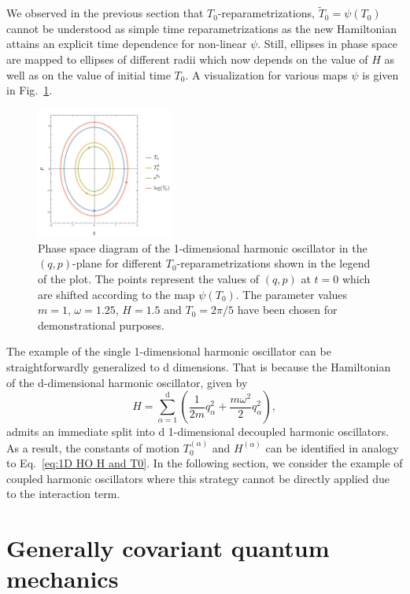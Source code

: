 \documentclass[onecolumn,notitlepage,superscriptaddress, nofootinbib,nobibnotes, aps,prd,10pt]{revtex4-1}%
\begin{document}
We observed in the previous section that $T_0$-reparametrizations, $\tilde{T}_0 = \psi(T_0)$ cannot be understood as simple time reparametrizations as the new Hamiltonian attains an explicit time dependence for non-linear $\psi$. Still, ellipses in phase space are mapped to ellipses of different radii which now depends on the value of $H$ as well as on the value of initial time $T_0$. A visualization for various maps $\psi$ is given in Fig.~\ref{fig:T0 reparam}.

\begin{figure}
    \centering
    \includegraphics[width=0.4\textwidth]{T0reparam.pdf}
    \caption{Phase space diagram of the 1-dimensional harmonic oscillator in the $(q,p)$-plane for different $T_0$-reparametrizations shown in the legend of the plot. The points represent the values of $(q,p)$ at $t = 0$ which are shifted according to the map $\psi(T_0)$. The parameter values $m=1$, $\omega = 1.25$, $H = 1.5$ and $T_0 = 2\pi/5$ have been chosen for demonstrational purposes.}
    \label{fig:T0 reparam}
\end{figure}

The example of the single 1-dimensional harmonic oscillator can be straightforwardly generalized to d dimensions. That is because the Hamiltonian of the d-dimensional harmonic oscillator, given by 
%
\begin{equation}
H = \sum_{\alpha = 1}^\mathrm{d}\left(\frac{1}{2m}q_\alpha^2+\frac{m\omega^2}{2}q_\alpha^2\right),
\end{equation}
%
admits an immediate split into d 1-dimensional decoupled harmonic oscillators. As a result, the constants of motion $T_0^{(\alpha)}$ and $H^{(\alpha)}$ can be identified in analogy to Eq.~\eqref{eq:1D HO H and T0}. In the following section, we consider the example of coupled harmonic oscillators where this strategy cannot be directly applied due to the interaction term.


\section{Generally covariant quantum mechanics}
\end{document}
